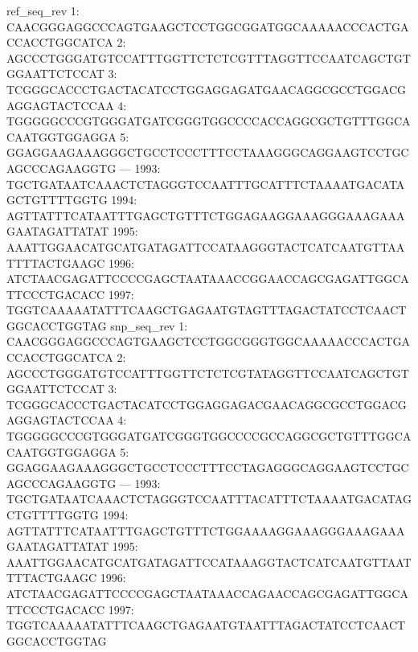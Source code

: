 \documentclass[a4paper,10pt]{article}
\begin{document}
\begin{Schunk}
\begin{Soutput}
                                                        ref_seq_rev
   1: CAACGGGAGGCCCAGTGAAGCTCCTGGCGGATGGCAAAAACCCACTGACCACCTGGCATCA
   2: AGCCCTGGGATGTCCATTTGGTTCTCTCGTTTAGGTTCCAATCAGCTGTGGAATTCTCCAT
   3: TCGGGCACCCTGACTACATCCTGGAGGAGATGAACAGGCGCCTGGACGAGGAGTACTCCAA
   4: TGGGGGCCCGTGGGATGATCGGGTGGCCCCACCAGGCGCTGTTTGGCACAATGGTGGAGGA
   5: GGAGGAAGAAAGGGCTGCCTCCCTTTCCTAAAGGGCAGGAAGTCCTGCAGCCCAGAAGGTG
  ---                                                              
1993: TGCTGATAATCAAACTCTAGGGTCCAATTTGCATTTCTAAAATGACATAGCTGTTTTGGTG
1994: AGTTATTTCATAATTTGAGCTGTTTCTGGAGAAGGAAAGGGAAAGAAAGAATAGATTATAT
1995: AAATTGGAACATGCATGATAGATTCCATAAGGGTACTCATCAATGTTAATTTTACTGAAGC
1996: ATCTAACGAGATTCCCCGAGCTAATAAACCGGAACCAGCGAGATTGGCATTCCCTGACACC
1997: TGGTCAAAAATATTTCAAGCTGAGAATGTAGTTTAGACTATCCTCAACTGGCACCTGGTAG
                                                        snp_seq_rev
   1: CAACGGGAGGCCCAGTGAAGCTCCTGGCGGGTGGCAAAAACCCACTGACCACCTGGCATCA
   2: AGCCCTGGGATGTCCATTTGGTTCTCTCGTATAGGTTCCAATCAGCTGTGGAATTCTCCAT
   3: TCGGGCACCCTGACTACATCCTGGAGGAGACGAACAGGCGCCTGGACGAGGAGTACTCCAA
   4: TGGGGGCCCGTGGGATGATCGGGTGGCCCCGCCAGGCGCTGTTTGGCACAATGGTGGAGGA
   5: GGAGGAAGAAAGGGCTGCCTCCCTTTCCTAGAGGGCAGGAAGTCCTGCAGCCCAGAAGGTG
  ---                                                              
1993: TGCTGATAATCAAACTCTAGGGTCCAATTTACATTTCTAAAATGACATAGCTGTTTTGGTG
1994: AGTTATTTCATAATTTGAGCTGTTTCTGGAAAAGGAAAGGGAAAGAAAGAATAGATTATAT
1995: AAATTGGAACATGCATGATAGATTCCATAAAGGTACTCATCAATGTTAATTTTACTGAAGC
1996: ATCTAACGAGATTCCCCGAGCTAATAAACCAGAACCAGCGAGATTGGCATTCCCTGACACC
1997: TGGTCAAAAATATTTCAAGCTGAGAATGTAATTTAGACTATCCTCAACTGGCACCTGGTAG
\end{Soutput}
\end{Schunk}
\end{document}
